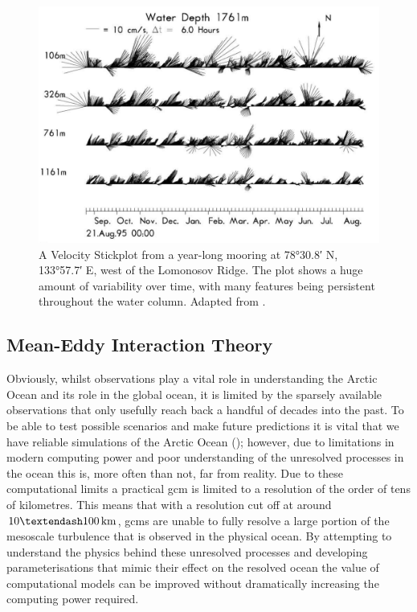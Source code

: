 \documentclass[10pt,a4paper]{article}
\begin{document}
\begin{figure}
	\centering
	\includegraphics[width=\linewidth]{Woodgate2001Mooring}
	\caption[Adapted from \cite{woodgate2001arctic}]{A Velocity Stickplot 
		from a year-long mooring at \ang{78;30.8;} N, \ang{133;57.7;} E, west of the Lomonosov Ridge.  The plot shows a huge amount of variability over time, with many
		features being persistent throughout the water column. Adapted from \cite{woodgate2001arctic}.}
	\label{fig:Woodgate2001Mooring}
\end{figure}

\subsection{Mean-Eddy Interaction Theory}

\label{meaneddyinteractiontheory}

 Obviously, whilst observations play a vital role in understanding the Arctic
 Ocean and its role in the global ocean, it is limited by the sparsely available
 observations that only usefully reach back a handful of decades into the past.
 To be able to test possible scenarios and make future predictions it is vital
 that we have reliable simulations of the Arctic Ocean (\cite{proshutinsky2008toward});
 however, due to limitations
 in modern computing power and poor understanding of the unresolved processes 
 in the ocean this is, more often than not, far from reality.
 Due to these computational limits a practical \gls{gcm} is 
 limited to a  resolution of the order of tens of kilometres. This means that with a 
 resolution  cut off at around $10 \textendash 100 \, \rm km$, 
 \glspl{gcm} are unable to fully resolve a large portion of the mesoscale turbulence that is
 observed in the physical ocean.
 By attempting  to understand the physics behind these unresolved processes 
 and developing parameterisations that mimic their effect on the resolved ocean
 the value of computational models can be improved without dramatically increasing the
 computing power required.  
 
\end{document}
